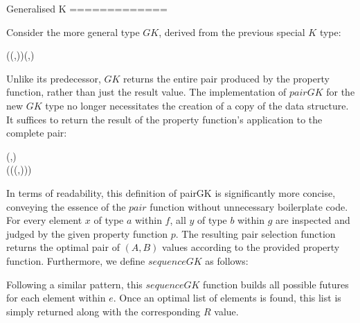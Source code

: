 Generalised K
=============

Consider the more general type $GK$, derived from the previous special $K$ type:
\begin{hscode}\SaveRestoreHook
{}%
%
%
\>[3]{}\;\;\;\mathrel{=}\;\mathbin{\circ}(\to (,))\to (,){}\<[E]%
\ColumnHook
\end{hscode}\resethooks
Unlike its predecessor, $GK$ returns the entire pair produced by the property function, 
rather than just the result value. The implementation of $pairGK$ for the new $GK$ type no 
longer necessitates the creation of a copy of the data structure. It suffices to return 
the result of the property function's application to the complete pair:
\begin{hscode}\SaveRestoreHook
{}%
%
%
\>[3]{}\mathbin{::}\;\;\to {}\;\;\to {}\;\;(,){}\<[E]%
\\
\>[3]{}\;\;\;\mathrel{=}\;(\lambda {}\to {}\;(\lambda {}\to {}\;(,))){}\<[E]%
\ColumnHook
\end{hscode}\resethooks
In terms of readability, this definition of pairGK is significantly more concise, 
conveying the essence of the $pair$ function without unnecessary boilerplate code. For 
every element $x$  of type $a$ within $f$, all $y$ of type $b$ within $g$ are inspected 
and judged by the given property function $p$. The resulting pair selection function 
returns the optimal pair of $(A,B)$ values according to the provided property function.
Furthermore, we define $sequenceGK$ as follows:
\resethooks
Following a similar pattern, this $sequenceGK$ function builds all possible futures for 
each element within $e$. Once an optimal list of elements is found, this list is simply 
returned along with the corresponding $R$ value.

